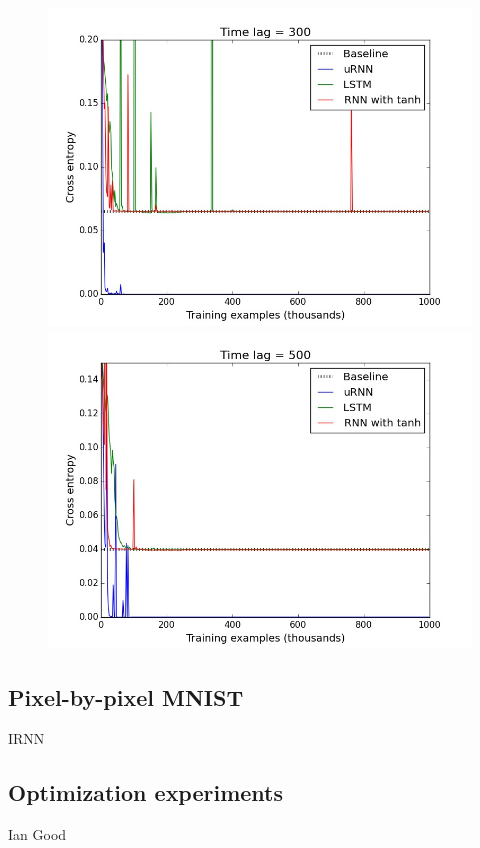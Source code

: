 \documentclass{article} %
\begin{document}
\begin{figure}[ht]
\begin{minipage}[b]{0.5\linewidth}
    \includegraphics[scale=0.25]{figures/memory_300.jpeg}
    \vspace{4ex}
    \end{minipage}%
  \begin{minipage}[b]{0.5\linewidth}
    \centering
    \includegraphics[scale=0.25]{figures/memory_500.jpeg}
    \vspace{4ex}
  \end{minipage} 
\end{figure}


\subsection{Pixel-by-pixel MNIST}
IRNN

\subsection{Optimization experiments}
Ian Good



\end{document}
